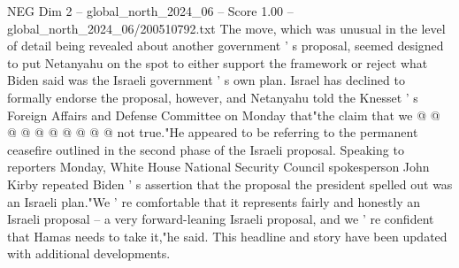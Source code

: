 \begin{textsample}{NEG Dim 2 – global\_north\_2024\_06 – Score 1.00 – global\_north\_2024\_06/200510792.txt}
The move, which was unusual in the level of detail being revealed about another government ' s proposal, seemed designed to put Netanyahu on the spot to either support the framework or reject what Biden said was the Israeli government ' s own plan.
Israel has declined to formally endorse the proposal, however, and Netanyahu told the Knesset ' s Foreign Affairs and Defense Committee on Monday that"the claim that we @ @ @ @ @ @ @ @ @ @ not true."He appeared to be referring to the permanent ceasefire outlined in the second phase of the Israeli proposal.
Speaking to reporters Monday, White House National Security Council spokesperson John Kirby repeated Biden ' s assertion that the proposal the president spelled out was an Israeli plan."We ' re comfortable that it represents fairly and honestly an Israeli proposal -- a very forward-leaning Israeli proposal, and we ' re confident that Hamas needs to take it,"he said.
This headline and story have been updated with additional developments.

\end{textsample}
